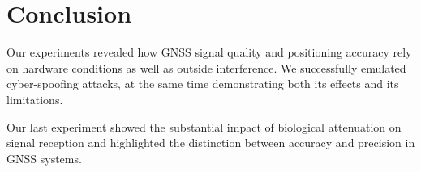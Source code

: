 \section{Conclusion}
\label{sec:conclusion}
Our experiments revealed how GNSS signal quality and positioning accuracy rely on hardware conditions as well as outside interference. We successfully emulated cyber-spoofing attacks, at the same time demonstrating both its effects and its limitations.

Our last experiment showed the substantial impact of biological attenuation on signal reception and highlighted the distinction between accuracy and precision in GNSS systems.